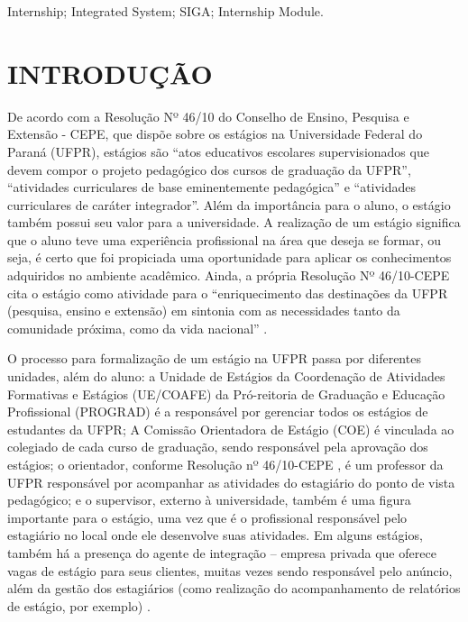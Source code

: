\documentclass[conference,a4paper,10pt]{IEEETran}
\begin{document}
\begin{keywords}
Internship; Integrated System; SIGA; Internship Module.
\end{keywords}



\section{INTRODUÇÃO}

De acordo com a Resolução Nº 46/10 do Conselho de Ensino, Pesquisa e Extensão - CEPE\cite{ufpr_est_res}, que dispõe sobre os estágios na Universidade Federal do Paraná (UFPR), estágios são ``atos educativos escolares supervisionados que devem compor o projeto pedagógico dos cursos de graduação da UFPR'', ``atividades curriculares de base eminentemente pedagógica'' e ``atividades curriculares de caráter integrador''. Além da importância para o aluno, o estágio também possui seu valor para a universidade. A realização de um estágio significa que o aluno teve uma experiência profissional na área que deseja se formar, ou seja, é certo que foi propiciada uma oportunidade para aplicar os conhecimentos adquiridos no ambiente acadêmico. Ainda, a própria Resolução Nº 46/10-CEPE cita o estágio como atividade para o ``enriquecimento das destinações da UFPR (pesquisa, ensino e extensão) em sintonia com as necessidades tanto da comunidade próxima, como da vida nacional'' \cite{ufpr_est_res}. 

O processo para formalização de um estágio na UFPR passa por diferentes unidades, além do aluno: a Unidade de Estágios da Coordenação de Atividades Formativas e Estágios (UE/COAFE) da Pró-reitoria de Graduação e Educação Profissional (PROGRAD) é a responsável por gerenciar todos os estágios de estudantes da UFPR; A Comissão Orientadora de Estágio (COE) é vinculada ao colegiado de cada curso de graduação, sendo responsável pela aprovação dos estágios; o orientador, conforme Resolução nº 46/10-CEPE \cite{ufpr_est_res}, é um professor da UFPR responsável por acompanhar as atividades do estagiário do ponto de vista pedagógico; e o supervisor, externo à universidade, também é uma figura importante para o estágio, uma vez que é o profissional responsável pelo estagiário no local onde ele desenvolve suas atividades. Em alguns estágios, também há a presença do agente de integração – empresa privada que oferece vagas de estágio para seus clientes, muitas vezes sendo responsável pelo anúncio, além da gestão dos estagiários (como realização do acompanhamento de relatórios de estágio, por exemplo) \cite{ufpr_est_res}. 
\end{document}
